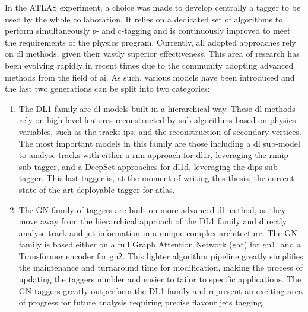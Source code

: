 In the ATLAS experiment, a choice was made to develop centrally a tagger to be used by the whole collaboration. It relies on a dedicated set of algorithms to perform simultaneously $b$- and $c$-tagging and is continuously improved to meet the requirements of the physics program. Currently, all adopted approaches rely on \gls{dl} methods, given their vastly superior effectiveness. This area of research has been evolving rapidly in recent times due to the community adopting advanced methods from the field of \gls{ai}. As such, various models have been introduced and the last two generations can be split into two categories: 
\begin{enumerate}
  \item The DL1 family are \gls{dl} models built in a hierarchical way. These \gls{dl} methods rely on high-level features reconstructed by sub-algorithms based on physics variables, such as the tracks \glspl{ip}, and the reconstruction of secondary vertices. The most important models in this family are those including a \gls{dl} sub-model to analyse tracks with either a \gls{rnn} approach for \gls{dl1r}, leveraging the \gls{rnnip} sub-tagger, and a DeepSet approaches for \gls{dl1d}, leveraging the \gls{dips} sub-tagger. This last tagger is, at the moment of writing this thesis, the current state-of-the-art deployable tagger for \gls{atlas}.
  \item The GN family of taggers are built on more advanced \gls{dl} method, as they move away from the hierarchical approach of the DL1 family and directly analyse track and jet information in a unique complex architecture. The GN family is based either on a full Graph Attention Network (\gls{gat}) for \gls{gn1}, and a Transformer encoder for \gls{gn2}. This lighter algorithm pipeline greatly simplifies the maintenance and turnaround time for modification, making the process of updating the taggers nimbler and easier to tailor to specific applications. The GN taggers greatly outperform the DL1 family and represent an exciting area of progress for future analysis requiring precise flavour jets tagging. 
\end{enumerate}

